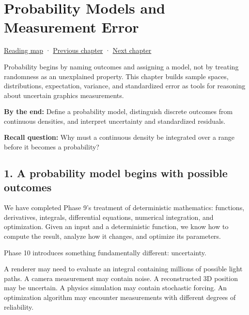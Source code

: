 \chapter{Probability Models and Measurement Error}\label{02-foundations-ii-ch023-probability-models-and-measurement-error}\hypertarget{02-foundations-ii-ch023}{}\label{stagechapter:02-foundations-ii-ch023}

\hypertarget{02-foundations-ii-ch023-probability-models-and-measurement-error}{}

\hyperref[volume-reading-map]{Reading map} · \hyperref[02-foundations-ii-ch022-accumulation-quadrature-and-the-bridge-to-probability]{Previous chapter} · \hyperref[02-foundations-ii-ch024-waiting-times-covariance-and-matrix-decomposition]{Next chapter}

Probability begins by naming outcomes and assigning a model, not by treating randomness as an unexplained property. This chapter builds sample spaces, distributions, expectation, variance, and standardized error as tools for reasoning about uncertain graphics measurements.

\textbf{By the end:} Define a probability model, distinguish discrete outcomes from continuous densities, and interpret uncertainty and standardized residuals.

\textbf{Recall question:} Why must a continuous density be integrated over a range before it becomes a probability?

\section{1. A probability model begins with possible outcomes}\label{02-foundations-ii-ch023-a-probability-model-begins-with-possible-outcomes}

\hypertarget{02-foundations-ii-ch023-a-probability-model-begins-with-possible-outcomes}{}

We have completed Phase 9's treatment of deterministic mathematics: functions, derivatives, integrals, differential equations, numerical integration, and optimization. Given an input and a deterministic function, we know how to compute the result, analyze how it changes, and optimize its parameters.

Phase 10 introduces something fundamentally different: uncertainty.

A renderer may need to evaluate an integral containing millions of possible light paths. A camera measurement may contain noise. A reconstructed 3D position may be uncertain. A physics simulation may contain stochastic forcing. An optimization algorithm may encounter measurements with different degrees of reliability.

